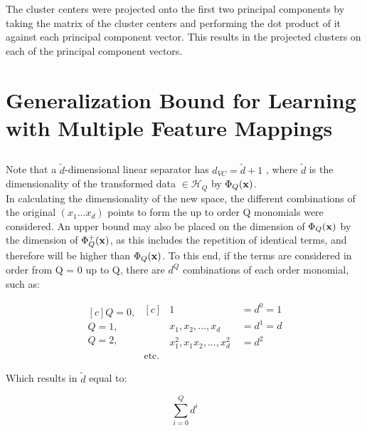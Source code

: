 \documentclass{scrartcl}
\begin{document}
The cluster centers were projected onto the first two principal components by taking the matrix of the cluster centers and performing the dot product of it against each principal component vector. This results in the projected clusters on each of the principal component vectors.

\newpage
\section{Generalization Bound for Learning with Multiple Feature Mappings}

\subsection{}

Note that a $\tilde{d}$-dimensional linear separator has $d_{VC} = \tilde{d} + 1$ \cite[p. 52]{abu}, where $\tilde{d}$ is the dimensionality of the transformed data $\in \mathcal{H}_Q$ by $\Phi_Q({\mathbf x})$.\\

In calculating the dimensionality of the new space, the different combinations of the original $(x_1...x_d)$ points to form the up to order Q monomials were considered. An upper bound may also be placed on the dimension of $\Phi_Q({\mathbf x})$ by the dimension of $\Phi_Q^+({\mathbf x})$, as this includes the repetition of identical terms, and therefore will be higher than $\Phi_Q({\mathbf x})$. To this end, if the terms are considered in order from Q = 0 up to Q, there are $d^Q$ combinations of each order monomial, such as:

\begin{equation*}
\begin{aligned}[c]
    Q=0, \\
    Q=1, \\
    Q=2, \\
    \\
\end{aligned}
\begin{aligned}[c]
    &1 \; &= d^0 = 1 \\
    &x_1, x_2, ..., x_d \; &= d^1 = d \\
    &x_1^2, x_1x_2, ..., x_d^2 \; &= d^2 \\
    \text{etc.}
\end{aligned}
\end{equation*}

Which results in $\tilde{d}$ equal to:

\[ \sum^Q_{i=0} d^i \]
\end{document}
